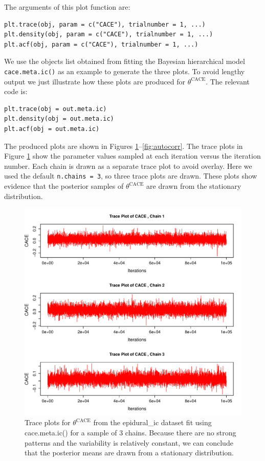 The arguments of this plot function are:

\begin{verbatim}
plt.trace(obj, param = c("CACE"), trialnumber = 1, ...)
plt.density(obj, param = c("CACE"), trialnumber = 1, ...)
plt.acf(obj, param = c("CACE"), trialnumber = 1, ...)
\end{verbatim}

\noindent We use the objects list obtained from fitting the Bayesian hierarchical model \texttt{cace.meta.ic()} as an example to generate the three plots. To avoid lengthy output we just illustrate how these plots are produced for \(\theta^\text{CACE}\). The relevant code is:

\begin{verbatim}
plt.trace(obj = out.meta.ic)
plt.density(obj = out.meta.ic)
plt.acf(obj = out.meta.ic)
\end{verbatim}

\noindent The produced plots are shown in Figures \ref{fig:trace}--\ref{fig:autocorr}.
The trace plots in Figure \ref{fig:trace} show the parameter values sampled at each iteration versus the iteration number. Each chain is drawn as a separate trace plot to avoid overlay.
Here we used the default \texttt{n.chains\ =\ 3}, so three trace plots are drawn. These plots show evidence that the posterior samples of \(\theta^\text{CACE}\) are drawn from the stationary distribution.

\begin{figure}

{\centering \includegraphics[width=0.95\linewidth,height=0.5\textheight]{trace_sep} 

}

\caption{Trace plots for $\theta^\text{CACE}$ from the epidural\_ic dataset fit using cace.meta.ic() for a sample of 3 chains. Because there are no strong patterns and the variability is relatively constant, we can conclude that the posterior means are drawn from a stationary distribution.}\label{fig:trace}
\end{figure}

